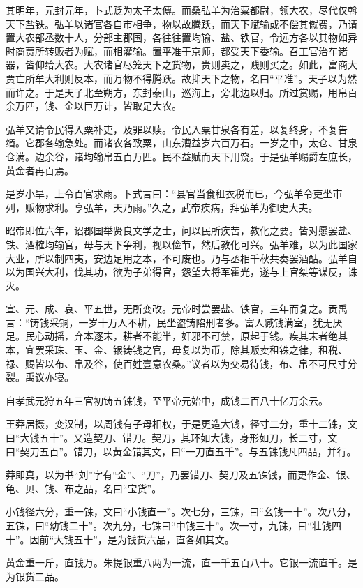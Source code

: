 \documentclass[]{article}
\begin{document}
其明年，元封元年，卜式贬为太子太傅。而桑弘羊为治粟都尉，领大农，尽代仅斡天下盐铁。弘羊以诸官各自市相争，物以故腾跃，而天下赋输或不偿其僦费，乃请置大农部丞数十人，分部主郡国，各往往置均输、盐、铁官，令远方各以其物如异时商贾所转贩者为赋，而相灌输。置平准于京师，都受天下委输。召工官治车诸器，皆仰给大农。大农诸官尽笼天下之货物，贵则卖之，贱则买之。如此，富商大贾亡所牟大利则反本，而万物不得腾跃。故抑天下之物，名曰``平准''。天子以为然而许之。于是天子北至朔方，东封泰山，巡海上，旁北边以归。所过赏赐，用帛百余万匹，钱、金以巨万计，皆取足大农。

弘羊又请令民得入粟补吏，及罪以赎。令民入粟甘泉各有差，以复终身，不复告缗。它郡各输急处。而诸农各致粟，山东漕益岁六百万石。一岁之中，太仓、甘泉仓满。边余谷，诸均输帛五百万匹。民不益赋而天下用饶。于是弘羊赐爵左庶长，黄金者再百焉。

是岁小旱，上令百官求雨。卜式言曰：``县官当食租衣税而已，今弘羊令吏坐市列，贩物求利。亨弘羊，天乃雨。''久之，武帝疾病，拜弘羊为御史大夫。

昭帝即位六年，诏郡国举贤良文学之士，问以民所疾苦，教化之要。皆对愿罢盐、铁、酒榷均输官，毋与天下争利，视以俭节，然后教化可兴。弘羊难，以为此国家大业，所以制四夷，安边足用之本，不可废也。乃与丞相千秋共奏罢酒酤。弘羊自以为国兴大利，伐其功，欲为子弟得官，怨望大将军霍光，遂与上官桀等谋反，诛灭。

宣、元、成、哀、平五世，无所变改。元帝时尝罢盐、铁官，三年而复之。贡禹言：``铸钱采铜，一岁十万人不耕，民坐盗铸陷刑者多。富人臧钱满室，犹无厌足。民心动摇，弃本逐末，耕者不能半，奸邪不可禁，原起于钱。疾其末者绝其本，宜罢采珠、玉、金、银铸钱之官，毋复以为币，除其贩卖租铢之律，租税、禄、赐皆以布、帛及谷，使百姓壹意农桑。''议者以为交易待钱，布、帛不可尺寸分裂。禹议亦寝。

自孝武元狩五年三官初铸五铢钱，至平帝元始中，成钱二百八十亿万余云。

王莽居摄，变汉制，以周钱有子母相权，于是更造大钱，径寸二分，重十二铢，文曰``大钱五十''。又造契刀、错刀。契刀，其环如大钱，身形如刀，长二寸，文曰``契刀五百''。错刀，以黄金错其文，曰``一刀直五千''。与五铢钱凡四品，并行。

莽即真，以为书``刘''字有``金''、``刀''，乃罢错刀、契刀及五铢钱，而更作金、银、龟、贝、钱、布之品，名曰``宝货''。

小钱径六分，重一铢，文曰``小钱直一''。次七分，三铢，曰``幺钱一十''。次八分，五铢，曰``幼钱二十''。次九分，七铢曰``中钱三十''。次一寸，九铢，曰``壮钱四十''。因前``大钱五十''，是为钱货六品，直各如其文。

黄金重一斤，直钱万。朱提银重八两为一流，直一千五百八十。它银一流直千。是为银货二品。
\end{document}
